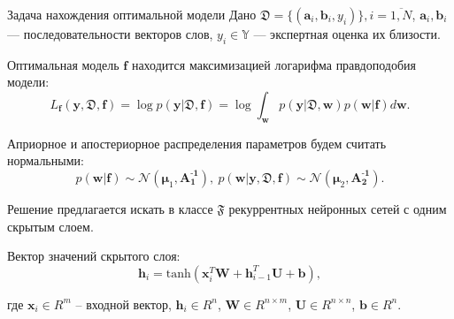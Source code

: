 \documentclass{beamer}
\newcommand{\PP}{p}
\newcommand{\DD}{{\mathfrak{D}}}
\newcommand{\FFF}{{\mathfrak{F}}}
\newcommand{\bw}{{\textbf{w}}}
\newcommand{\ba}{{\textbf{a}}}
\newcommand{\bb}{{\textbf{b}}}
\newcommand{\bbf}{{\textbf{f}}}
\newcommand{\by}{{\textbf{y}}}
\newcommand{\bAo}{\mathbf{A^\text{-1}_\text{1}}}
\newcommand{\bAt}{\mathbf{A^\text{-1}_\text{2}}}
\newcommand{\bmuo}{{\boldsymbol{\mu}_1}}
\newcommand{\bmut}{{\boldsymbol{\mu}_2}}
\begin{document}
\begin{frame}{Задача нахождения оптимальной модели}
Дано $\DD = \{(\ba_i,\bb_i,y_i)\}, i = \overline{1,N}$,
$\ba_i, \bb_i$ --- последовательности векторов слов,
$y_i \in \mathbb{Y}$
--- экспертная оценка их близости. 

Оптимальная модель $\bbf$ находится максимизацией логарифма правдоподобия модели:%
$$L_\bbf(\by,\DD,\bbf) = \log \PP(\by|\DD,\bbf) = \log \int_{\bw}\PP(\by|\DD,\bw)\PP(\bw|\bbf)d\bw.$$

Априорное и апостериорное распределения параметров будем считать нормальными:
$$\PP(\bw|\bbf) \sim \mathcal{N}(\bmuo,\bAo), \ \PP(\bw|\by,\DD,\bbf) \sim \mathcal{N}(\bmut,\bAt).$$

Решение предлагается искать в классе $\mathfrak{F}$ рекуррентных нейронных сетей с одним скрытым слоем.


Вектор значений скрытого слоя:
$$\mathbf{h}_i = \text{tanh}(\mathbf{x}_i^T\mathbf{W} + \mathbf{h}_{i-1}^T\mathbf{U} + \mathbf{b}),$$

где $\mathbf{x}_i\in R^m$ -- входной вектор, $\mathbf{h}_i\in R^n$, $\mathbf{W}\in R^{n \times m}$, $\mathbf{U}\in R^{n \times n}$, $\mathbf{b} \in R^n$.

\end{frame}

%
%
%
\end{document}
